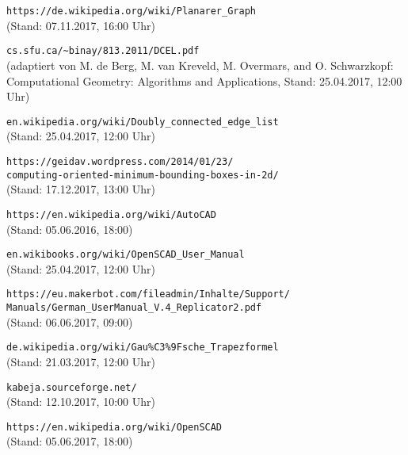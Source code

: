 \nocite{*}
\begin{thebibliography}{9}
		\verb|https://de.wikipedia.org/wiki/Planarer_Graph| \\ (Stand: 07.11.2017, 16:00 Uhr)
		
		\verb|cs.sfu.ca/~binay/813.2011/DCEL.pdf| \\ (adaptiert von M. de Berg, M. van Kreveld, M. Overmars, and O. Schwarzkopf: Computational Geometry: Algorithms and Applications, Stand: 25.04.2017, 12:00 Uhr)
		
		\verb|en.wikipedia.org/wiki/Doubly_connected_edge_list| \\ (Stand: 25.04.2017, 12:00 Uhr)
		
		\verb|https://geidav.wordpress.com/2014/01/23/|\\
		\verb|computing-oriented-minimum-bounding-boxes-in-2d/| \\ (Stand: 17.12.2017, 13:00 Uhr)
		
		\verb|https://en.wikipedia.org/wiki/AutoCAD| \\ (Stand: 05.06.2016, 18:00)
		
		\verb|en.wikibooks.org/wiki/OpenSCAD_User_Manual| \\ (Stand: 25.04.2017, 12:00 Uhr)
		
		\verb|https://eu.makerbot.com/fileadmin/Inhalte/Support/| \\
		\tab \verb|Manuals/German_UserManual_V.4_Replicator2.pdf| \\ (Stand: 06.06.2017, 09:00)
	
		\verb|de.wikipedia.org/wiki/Gau%C3%9Fsche_Trapezformel| \\ (Stand: 21.03.2017, 12:00 Uhr)
		
		 \verb|kabeja.sourceforge.net/| \\ (Stand: 12.10.2017, 10:00 Uhr)
		
		 
		 \verb|https://en.wikipedia.org/wiki/OpenSCAD| \\ (Stand: 05.06.2017, 18:00)
\end{thebibliography}